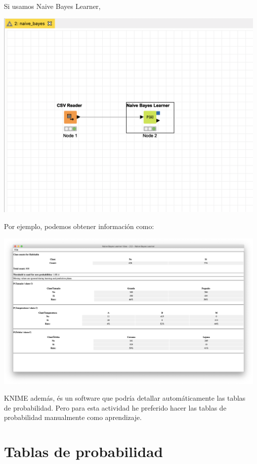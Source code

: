 \documentclass[11pt]{exam}
\begin{document}
\begin{questions}
Si usamos Naive Bayes Learner, 

\begin{center}
	\includegraphics[scale=0.35]{workflow.png}
\end{center}

Por ejemplo, podemos obtener información como:

\begin{center}
	\includegraphics[scale=0.3]{table.png}
\end{center}

KNIME además, és un software que podría detallar automáticamente las tablas de probabilidad. Pero para esta actividad he preferido hacer las tablas de probabilidad manualmente como aprendizaje.

\section*{Tablas de probabilidad}


\end{questions}
\end{document}
